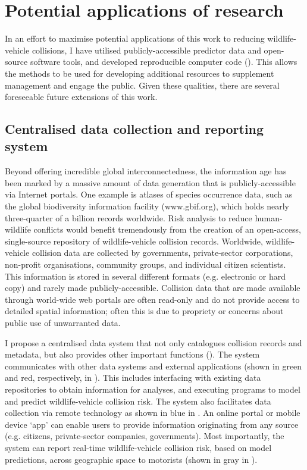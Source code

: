 \section{Potential applications of research}

In an effort to maximise potential applications of this work to reducing wildlife-vehicle collisions, I have utilised publicly-accessible predictor data and open-source software tools, and developed reproducible computer code (). This allows the methods to be used for developing additional resources to supplement management and engage the public. Given these qualities, there are several foreseeable future extensions of this work. 

\subsection{Centralised data collection and reporting system}

Beyond offering incredible global interconnectedness, the information age has been marked by a massive amount of data generation that is publicly-accessible via Internet portals. One example is atlases of species occurrence data, such as the global biodiversity information facility (www.gbif.org), which holds nearly three-quarter of a billion records worldwide. Risk analysis to reduce human-wildlife conflicts would benefit tremendously from the creation of an open-access, single-source repository of wildlife-vehicle collision records. Worldwide, wildlife-vehicle collision data are collected by governments, private-sector corporations, non-profit organisations, community groups, and individual citizen scientists. This information is stored in several different formats (e.g. electronic or hard copy) and rarely made publicly-accessible. Collision data that are made available through world-wide web portals are often read-only and do not provide access to detailed spatial information; often this is due to propriety or concerns about public use of unwarranted data.

I propose a centralised data system that not only catalogues collision records and metadata, but also provides other important functions (). The system communicates with other data systems and external applications (shown in green and red, respectively, in ). This includes interfacing with existing data repositories to obtain information for analyses, and executing programs to model and predict wildlife-vehicle collision risk. The system also facilitates data collection via remote technology as shown in blue in . An online portal or mobile device `app' can enable users to provide information originating from any source (e.g. citizens, private-sector companies, governments). Most importantly, the system can report real-time wildlife-vehicle collision risk, based on model predictions, across geographic space to motorists (shown in gray in ).

